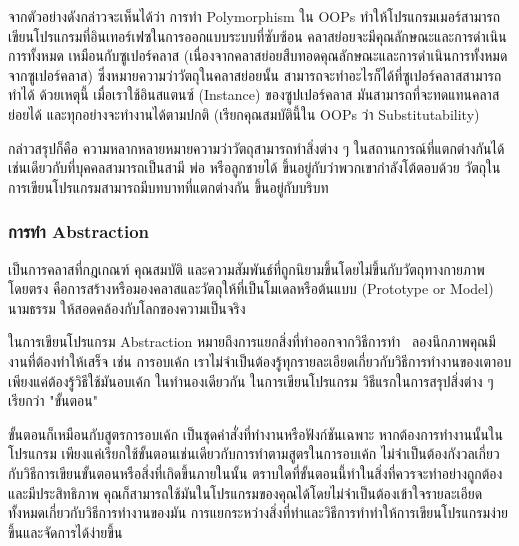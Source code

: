 \documentclass[12pt,one side,openright,a4paper]{cpe-thesis-th}
\newcommand{\thaijustify}[1]{%
  \par\hspace{30pt}\justifying
  #1
}
\begin{document}
\thaijustify{
  จากตัวอย่างดังกล่าวจะเห็นได้ว่า การทำ Polymorphism ใน OOPs ทำให้โปรแกรมเมอร์สามารถเขียนโปรแกรมที่อินเทอร์เฟซในการออกแบบระบบที่ซับซ้อน คลาสย่อยจะมีคุณลักษณะและการดำเนินการทั้งหมด เหมือนกับซูเปอร์คลาส (เนื่องจากคลาสย่อยสืบทอดคุณลักษณะและการดำเนินการทั้งหมดจากซูเปอร์คลาส) ซึ่งหมายความว่าวัตถุในคลาสย่อยนั้น สามารถจะทำอะไรก็ได้ที่ซูเปอร์คลาสสามารถทำได้ ด้วยเหตุนี้ เมื่อเราใช้อินสแตนซ์ (Instance) ของซูปเปอร์คลาส มันสามารถที่จะทดแทนคลาสย่อยได้ และทุกอย่างจะทำงานได้ตามปกติ (เรียกคุณสมบัตินี้ใน OOPs ว่า Substitutability)~\cite{ntu20polymorph}
}
\thaijustify{
  กล่าวสรุปก็คือ ความหลากหลายหมายความว่าวัตถุสามารถทำสิ่งต่าง ๆ ในสถานการณ์ที่แตกต่างกันได้ เช่นเดียวกับที่บุคคลสามารถเป็นสามี พ่อ หรือลูกชายได้ ขึ้นอยู่กับว่าพวกเขากำลังโต้ตอบด้วย วัตถุในการเขียนโปรแกรมสามารถมีบทบาทที่แตกต่างกัน ขึ้นอยู่กับบริบท~\cite{nzeruekenneth23polymorph}
}
\subsubsection{การทำ Abstraction}
\thaijustify{
  เป็นการคลาสที่กฎเกณฑ์ คุณสมบัติ และความสัมพันธ์ที่ถูกนิยามขึ้นโดยไม่ขึ้นกับวัตถุทางกายภาพโดยตรง คือการสร้างหรือมองคลาสและวัตถุให้ที่เป็นโมเดลหรือต้นแบบ (Prototype or Model) นามธรรม ให้สอดคล้องกับโลกของความเป็นจริง~\cite{saladpukabstract}
}
\thaijustify{
  ในการเขียนโปรแกรม Abstraction หมายถึงการแยกสิ่งที่ทำออกจากวิธีการทำ~\cite{liskov87abstaction} ลองนึกภาพคุณมีงานที่ต้องทำให้เสร็จ เช่น การอบเค้ก เราไม่จำเป็นต้องรู้ทุกรายละเอียดเกี่ยวกับวิธีการทำงานของเตาอบ เพียงแค่ต้องรู้วิธีใช้มันอบเค้ก ในทำนองเดียวกัน ในการเขียนโปรแกรม วิธีแรกในการสรุปสิ่งต่าง ๆ เรียกว่า "ขั้นตอน"
}
\thaijustify{
  ขั้นตอนก็เหมือนกับสูตรการอบเค้ก เป็นชุดคำสั่งที่ทำงานหรือฟังก์ชันเฉพาะ หากต้องการทำงานนั้นในโปรแกรม เพียงแค่เรียกใช้ขั้นตอนเช่นเดียวกับการทำตามสูตรในการอบเค้ก ไม่จำเป็นต้องกังวลเกี่ยวกับวิธีการเขียนขั้นตอนหรือสิ่งที่เกิดขึ้นภายในนั้น ตราบใดที่ขั้นตอนนี้ทำในสิ่งที่ควรจะทำอย่างถูกต้องและมีประสิทธิภาพ คุณก็สามารถใช้มันในโปรแกรมของคุณได้โดยไม่จำเป็นต้องเข้าใจรายละเอียดทั้งหมดเกี่ยวกับวิธีการทำงานของมัน การแยกระหว่างสิ่งที่ทำและวิธีการทำทำให้การเขียนโปรแกรมง่ายขึ้นและจัดการได้ง่ายขึ้น
}
\end{document}
